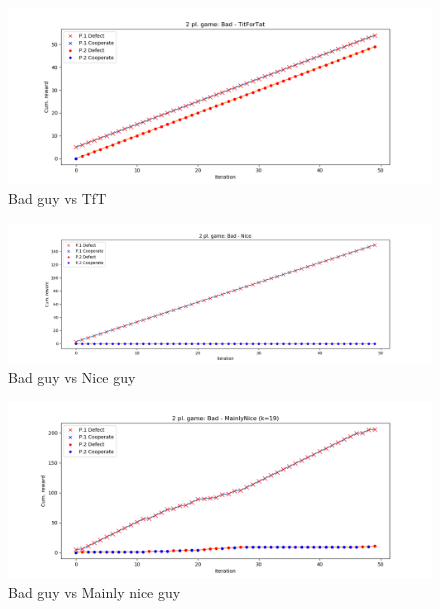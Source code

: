 \documentclass[journal,a4paper,10pt,twoside,draft]{IEEEtran}
\begin{document}
\begin{figure}
    \centering
    \includegraphics[width=1\columnwidth]{../img_v1/idp2p-rewards-Bad-TitForTat.png}
    \caption{Bad guy vs TfT}
    \label{fig:badvstft}
\end{figure}

\begin{figure}
    \centering
    \includegraphics[width=1\columnwidth]{../img_v1/idp2p-rewards-Bad-Nice.png}
    \caption{Bad guy vs Nice guy}
    \label{fig:badvsnice}
\end{figure}

\begin{figure}
    \centering
    \includegraphics[width=1\columnwidth]{../img_v1/idp2p-rewards-Bad-MainlyNice (k=19).png}
    \caption{Bad guy vs Mainly nice guy}
    \label{fig:badvsmainlynice}
\end{figure}
\end{document}
